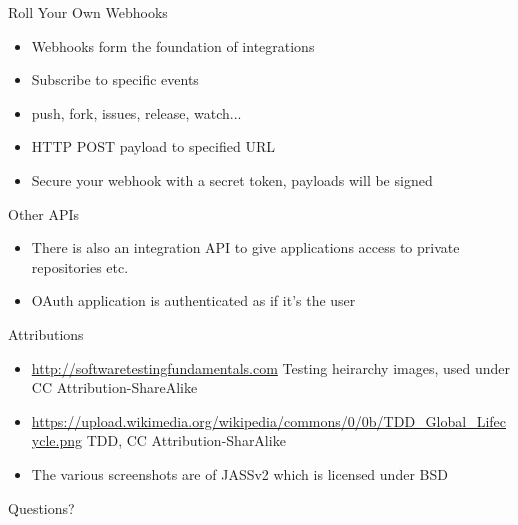 \documentclass{beamer}
\begin{document}
\begin{frame}{Roll Your Own}
	Webhooks
	\begin{itemize}
		\item Webhooks form the foundation of integrations
		\item Subscribe to specific events
		\item push, fork, issues, release, watch...
		\item HTTP POST payload to specified URL
		\item Secure your webhook with a secret token, payloads will be signed
	\end{itemize}
	Other APIs
	\begin{itemize}
		\item There is also an integration API to give applications access to private repositories etc.
		\item OAuth application is authenticated as if it's the user
	\end{itemize}
\end{frame}

\begin{frame}{Attributions}
	\begin{itemize}
		\item \url{http://softwaretestingfundamentals.com} Testing heirarchy images, used under CC Attribution-ShareAlike
		\item \url{https://upload.wikimedia.org/wikipedia/commons/0/0b/TDD_Global_Lifecycle.png} TDD, CC Attribution-SharAlike
		\item The various screenshots are of JASSv2 which is licensed under BSD
	\end{itemize}
\end{frame}

\begin{frame}{Questions?}
\end{frame}
\end{document}

